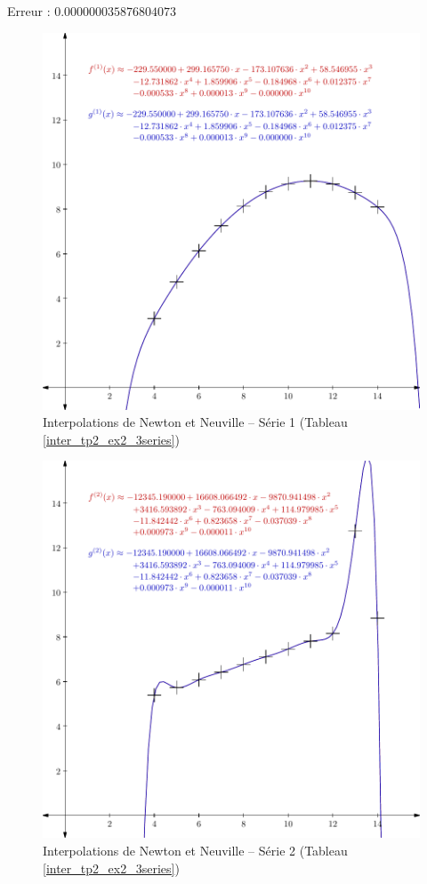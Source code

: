 \documentclass{report}
\begin{document}
	Erreur : $0.000000035876804073$
	\newpage
	\begin{figure}[h]
	  \centering
  	\includegraphics[scale=0.5]{graphiques/pdf_output/inter_tp2_ex2_1.pdf}
	  \caption{Interpolations de Newton et Neuville -- Série 1 (Tableau \ref{inter_tp2_ex2_3series})}
	\end{figure}
	\begin{figure}[h]
	  \centering
	  \includegraphics[scale=0.5]{graphiques/pdf_output/inter_tp2_ex2_2.pdf}
	  \caption{Interpolations de Newton et Neuville -- Série 2 (Tableau \ref{inter_tp2_ex2_3series})}
	\end{figure}
\end{document}
